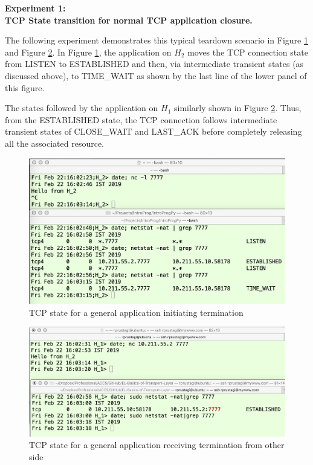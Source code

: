 \begin{multicols}{2}
\medskip
\noindent
\textbf{Experiment 1:\\ TCP State transition for normal TCP application closure.}
\smallskip

The following experiment demonstrates this typical teardown scenario in Figure \ref{chap3-fig3} and Figure \ref{chap3-fig4}. In Figure \ref{chap3-fig3}, the application on $H_{2}$ moves the TCP connection state from LISTEN to ESTABLISHED and then, via intermediate transient states (as discussed above), to TIME\_WAIT as shown by the last line of the lower panel of this figure.

The states followed by the application on $H_{1}$ similarly shown in Figure \ref{chap3-fig4}. Thus, from the ESTABLISHED state, the TCP connection follows intermediate transient states of CLOSE\_WAIT and LAST\_ACK before completely releasing all the associated resource.
\end{multicols}

\begin{figure}[!htb]
\centering
\includegraphics[scale=.25]{src/Figures/chap3/3.jpg}
\caption{TCP state for a general application initiating termination}\label{chap3-fig3}
\end{figure}

\begin{figure}[!htb]
\centering
\includegraphics[scale=.45]{src/Figures/chap3/4.jpg}
\caption{TCP state for a general application receiving termination from other side}\label{chap3-fig4}
\end{figure}

